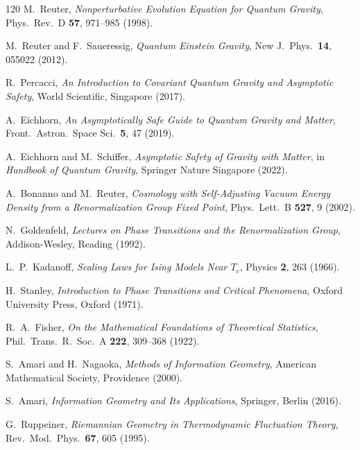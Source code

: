 \documentclass[12pt,a4paper]{article}
\begin{document}
\begin{thebibliography}{120}
M.~Reuter,
\textit{Nonperturbative Evolution Equation for Quantum Gravity},
Phys.\ Rev.\ D \textbf{57}, 971--985 (1998).

M.~Reuter and F.~Saueressig,
\textit{Quantum Einstein Gravity},
New J.\ Phys.\ \textbf{14}, 055022 (2012).

R.~Percacci,
\textit{An Introduction to Covariant Quantum Gravity and Asymptotic Safety},
World Scientific, Singapore (2017).

A.~Eichhorn,
\textit{An Asymptotically Safe Guide to Quantum Gravity and Matter},
Front.\ Astron.\ Space Sci.\ \textbf{5}, 47 (2019).

A.~Eichhorn and M.~Schiffer,
\textit{Asymptotic Safety of Gravity with Matter},
in \textit{Handbook of Quantum Gravity},
Springer Nature Singapore (2022).

A.~Bonanno and M.~Reuter,
\textit{Cosmology with Self-Adjusting Vacuum Energy Density from a
Renormalization Group Fixed Point},
Phys.\ Lett.\ B \textbf{527}, 9 (2002).


N.~Goldenfeld,
\textit{Lectures on Phase Transitions and the Renormalization Group},
Addison-Wesley, Reading (1992).

L.~P.~Kadanoff,
\textit{Scaling Laws for Ising Models Near $T_c$},
Physics \textbf{2}, 263 (1966).

H.~Stanley,
\textit{Introduction to Phase Transitions and Critical Phenomena},
Oxford University Press, Oxford (1971).


R.~A.~Fisher,
\textit{On the Mathematical Foundations of Theoretical Statistics},
Phil.\ Trans.\ R.\ Soc.\ A \textbf{222}, 309--368 (1922).

S.~Amari and H.~Nagaoka,
\textit{Methods of Information Geometry},
American Mathematical Society, Providence (2000).

S.~Amari,
\textit{Information Geometry and Its Applications},
Springer, Berlin (2016).

G.~Ruppeiner,
\textit{Riemannian Geometry in Thermodynamic Fluctuation Theory},
Rev.\ Mod.\ Phys.\ \textbf{67}, 605 (1995).


\end{thebibliography}
\end{document}

